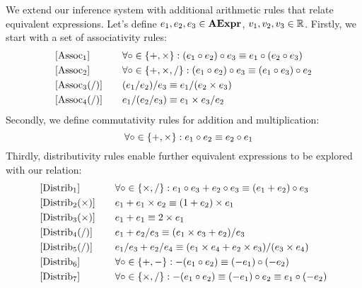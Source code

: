 We extend our inference system with additional arithmetic rules that relate
equivalent expressions.  Let's define $e_1, e_2, e_3 \in \mathbf{AExpr}$, $v_1, v_2,
v_3 \in \mathbb{R}$.  Firstly, we start with a set of associativity rules:
\begin{equation}
    \begin{aligned}{}
        & [\mathrm{Assoc}_1] & \quad &
            \forall \circ \in \{ +, \times \}:
            (e_1 \circ e_2) \circ e_3 \equiv e_1 \circ (e_2 \circ e_3) \\
        & [\mathrm{Assoc}_2] & \quad &
            \forall \circ \in \{ +, \times, / \}:
            (e_1 \circ e_2) \circ e_3 \equiv (e_1 \circ e_3) \circ e_2 \\
        & [\mathrm{Assoc}_3 (/)] & \quad &
            (e_1 / e_2) / e_3 \equiv e_1 / (e_2 \times e_3) \\
        & [\mathrm{Assoc}_4 (/)] & \quad &
            e_1 / (e_2 / e_3) \equiv e_1 \times e_3 / e_2
    \end{aligned}
\end{equation}
Secondly, we define commutativity rules for addition and multiplication:
\begin{equation}
    [\mathrm{Commut}] \quad
    \forall \circ \in \{ +, \times \}: e_1 \circ e_2 \eqrel e_2 \circ e_1
\end{equation}
Thirdly, distributivity rules enable further equivalent expressions to be
explored with our relation:
\begin{equation}
    \begin{aligned}{}
        & [\mathrm{Distrib}_1] & \quad &
            \forall \circ \in \{ \times, / \}:
            e_1 \circ e_3 + e_2 \circ e_3 \equiv (e_1 + e_2) \circ e_3 \\
        & [\mathrm{Distrib}_2 (\times)] & \quad &
            e_1 + e_1 \times e_2 \equiv (1 + e_2) \times e_1 \\
        & [\mathrm{Distrib}_3 (\times)] & \quad &
            e_1 + e_1 \equiv 2 \times e_1 \\
        & [\mathrm{Distrib}_4 (/)] & \quad &
            e_1 + e_2 / e_3 \equiv (e_1 \times e_3 + e_2) / e_3 \\
        & [\mathrm{Distrib}_5 (/)] & \quad &
            e_1 / e_3 + e_2 / e_4 \equiv
            (e_1 \times e_4 + e_2 \times e_3) / (e_3 \times e_4) \\
        & [\mathrm{Distrib}_6] & \quad &
            \forall \circ \in \{ +, - \}:
            -(e_1 \circ e_2) \equiv (-e_1) \circ (-e_2) \\
        & [\mathrm{Distrib}_7] & \quad &
            \forall \circ \in \{ \times, / \}:
            -(e_1 \circ e_2) \equiv (-e_1) \circ e_2 \equiv e_1 \circ (-e_2)
    \end{aligned}
\end{equation}
